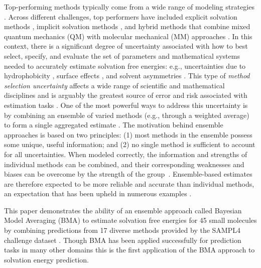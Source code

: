\documentclass[journal=jpcbfk, manuscript=article]{achemso}
\newcommand{\+}[1]{\ensuremath{\mathbf{#1}}}
\newcommand{\rev}[1]{#1}
\begin{document}
\rev{Top-performing methods typically come from a wide range of modeling strategies \cite{Nicholls:2008, Mobley:2009b, Mobley:2009, Mobley:2014}}.
Across different challenges, top performers have included explicit solvation methods \cite{Klimovich:2010, Levy:1998, Mobley:2009c}, implicit solvation methods \cite{Mennucci:2007,Jorgensen:2004}, and hybrid methods that combine mixed quantum mechanics (QM) with molecular mechanical (MM) approaches \cite{Konig:2014, Kamerlin:2009}.
In this context, there is a significant degree of uncertainty associated with how to best select, specify, and evaluate the set of parameters and mathematical systems needed to accurately estimate solvation free energies: e.g., uncertainties due to hydrophobicity \cite{Ashbaugh:1999}, surface effects \cite{Chorny:05}, and solvent asymmetries \cite{Mobley:08}.  This type of \emph{method selection uncertainty} affects a wide range of scientific and mathematical disciplines and is arguably the greatest source of error and risk associated with estimation tasks \cite{Rojas:2010, Apostolakis:1990, Devooght:1998, Neuman:2003}.
One of the most powerful ways to address this uncertainty is by combining an ensemble of varied methods (e.g., through a weighted average) to form a single aggregated estimate \cite{Bates:1969, Opitz:1999, Rokach:2010, Hoeting:1999}.
The motivation behind ensemble approaches is based on two principles: (1) most methods in the ensemble possess some unique, useful information; and (2) no single method is sufficient to account for all uncertainties.
When modeled correctly, the information and strengths of individual methods can be combined, and their corresponding weaknesses and biases can be overcome by the strength of the \rev{group}~\cite{Seni:2010, Hoeting:1999,Raftery:1998,Raftery:1995}. 
Ensemble-based estimates are therefore expected to be more reliable and accurate than individual methods, an expectation that has been upheld in numerous examples \cite{Gosink:2014, Zhang:2003, Bates:1969, Morales-Casique:2010, Opitz:1999, Rokach:2010, Hoeting:1999, Seni:2010, Raftery:2005, Vlachopoulo:2013, Seni:2010, Hoeting:1999, Raftery:1998, Raftery:1995}.

This paper demonstrates the ability of an ensemble approach called Bayesian Model Averaging (BMA) \cite{Hoeting:1999} to estimate solvation free energies for 45 small molecules by combining predictions from 17 diverse methods provided by the SAMPL4 challenge dataset \cite{Mobley:2014}.
Though BMA has been applied successfully for prediction tasks in many other domains \cite{Ye:2004, Vlachopoulo:2013, Raftery:2005, Morales-Casique:2010, Gosink:2014} this is the first application of the BMA approach \rev{to} solvation energy prediction.
\end{document}
